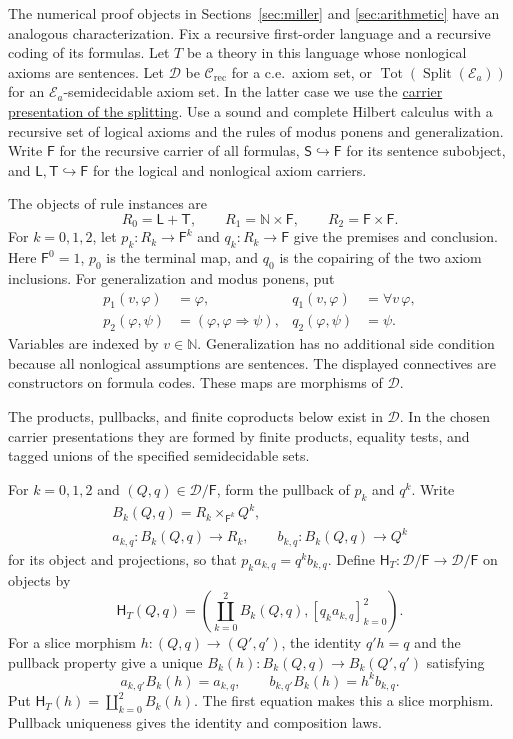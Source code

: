 \documentclass[11pt]{article}
\newcommand{\N}{\mathbb N}
\begin{document}
The numerical proof objects in Sections~\ref{sec:miller} and
\ref{sec:arithmetic} have an analogous characterization.
Fix a recursive first-order language and a recursive coding of its
formulas. Let $T$ be a theory in this language whose nonlogical axioms
are sentences. Let
$\mathcal D$ be $\mathcal C_{\mathrm{rec}}$ for a c.e.\ axiom set,
or $\operatorname{Tot}(\operatorname{Split}(\mathcal E_a))$ for an
$\mathcal E_a$-semidecidable axiom set. In the latter case we use the
\hyperref[def:miller-splitting]{carrier presentation of the splitting}.
Use a sound and complete
Hilbert calculus with a recursive set of logical axioms and the rules
of modus ponens and generalization.
Write $\mathsf F$ for the recursive carrier of all formulas,
$\mathsf S\hookrightarrow\mathsf F$ for its sentence subobject, and
$\mathsf L,\mathsf T\hookrightarrow\mathsf F$ for the logical and
nonlogical axiom carriers.

The objects of rule instances are
\[
 R_0=\mathsf L+\mathsf T,\qquad
 R_1=\N\times\mathsf F,\qquad R_2=\mathsf F\times\mathsf F.
\]
For $k=0,1,2$, let $p_k:R_k\to\mathsf F^k$ and
$q_k:R_k\to\mathsf F$ give the premises and conclusion. Here
$\mathsf F^0=1$, $p_0$ is the terminal map, and $q_0$ is the copairing
of the two axiom inclusions. For generalization and modus ponens, put
\[
\begin{aligned}
 p_1(v,\varphi)&=\varphi,&
 q_1(v,\varphi)&=\forall v\,\varphi,\\
 p_2(\varphi,\psi)&=(\varphi,\varphi\Rightarrow\psi),&
 q_2(\varphi,\psi)&=\psi.
\end{aligned}
\]
Variables are indexed by $v\in\N$. Generalization has no additional
side condition because all nonlogical assumptions are sentences.
The displayed connectives are constructors on formula codes.
These maps are morphisms of $\mathcal D$.

The products, pullbacks, and finite coproducts below exist in
$\mathcal D$. In the chosen carrier presentations they are formed
by finite products, equality tests, and tagged unions of the specified
semidecidable sets.

For $k=0,1,2$ and $(Q,q)\in\mathcal D/\mathsf F$, form the pullback
of $p_k$ and $q^k$. Write
\[
\begin{gathered}
 B_k(Q,q)=R_k\times_{\mathsf F^k}Q^k,
 \\
 a_{k,q}:B_k(Q,q)\to R_k,\qquad
 b_{k,q}:B_k(Q,q)\to Q^k
\end{gathered}
\]
for its object and projections, so that
$p_ka_{k,q}=q^kb_{k,q}$.
Define $\mathsf H_T:\mathcal D/\mathsf F\to\mathcal D/\mathsf F$
on objects by
\[
 \mathsf H_T(Q,q)=
 \left(\coprod_{k=0}^2 B_k(Q,q),
       [q_ka_{k,q}]_{k=0}^2\right).
\]
For a slice morphism $h:(Q,q)\to(Q',q')$, the identity $q'h=q$
and the pullback property give a unique
$B_k(h):B_k(Q,q)\to B_k(Q',q')$ satisfying
\[
 a_{k,q'}B_k(h)=a_{k,q},\qquad
 b_{k,q'}B_k(h)=h^kb_{k,q}.
\]
Put $\mathsf H_T(h)=\coprod_{k=0}^2 B_k(h)$.
The first equation makes this a slice morphism. Pullback uniqueness
gives the identity and composition laws.
\end{document}
